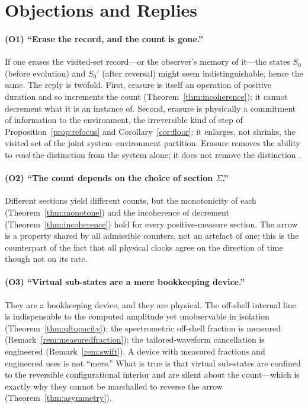 \documentclass[11pt,a4paper]{article}
\theoremstyle{thmstyle}
\theoremstyle{definition}
\theoremstyle{remark}
\begin{document}
\section{Objections and Replies}
\label{sec:objections}

\paragraph{(O1) ``Erase the record, and the count is gone.''}
If one erases the visited-set record---or the observer's memory of it---the
states $S_0$ (before evolution) and $S_0'$ (after reversal) might seem
indistinguishable, hence the same. The reply is twofold. First, erasure is
itself an operation of positive duration and so increments the count
(Theorem~\ref{thm:incoherence}); it cannot decrement what it is an instance
of. Second, erasure is physically a commitment of information to the
environment, the irreversible kind of step of
Proposition~\ref{prop:refocus} and Corollary~\ref{cor:floor}: it enlarges,
not shrinks, the visited set of the joint system--environment partition.
Erasure removes the ability to \emph{read} the distinction from the system
alone; it does not remove the distinction
\citep{landauer1961,bennett1982,szilard1929}.

\paragraph{(O2) ``The count depends on the choice of section $\Sigma$.''}
Different sections yield different counts, but the monotonicity of each
(Theorem~\ref{thm:monotone}) and the incoherence of decrement
(Theorem~\ref{thm:incoherence}) hold for every positive-measure section.
The arrow is a property shared by all admissible counters, not an artefact
of one; this is the counterpart of the fact that all physical clocks agree
on the direction of time though not on its rate.

\paragraph{(O3) ``Virtual sub-states are a mere bookkeeping device.''}
They are a bookkeeping device, and they are physical. The off-shell
internal line is indispensable to the computed amplitude yet unobservable in
isolation (Theorem~\ref{thm:qftopacity}); the spectrometric off-shell
fraction is measured (Remark~\ref{rem:measuredfraction}); the
tailored-waveform cancellation is engineered (Remark~\ref{rem:swift}). A
device with measured fractions and engineered uses is not ``mere.'' What is
true is that virtual sub-states are confined to the reversible
configurational interior and are silent about the count---which is exactly
why they cannot be marshalled to reverse the arrow
(Theorem~\ref{thm:asymmetry}).
\end{document}
